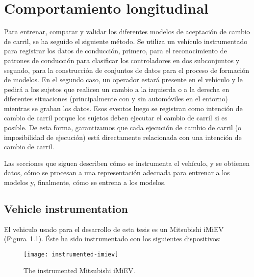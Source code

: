 \chapter{Comportamiento longitudinal}
\label{ch:longitudinal-submodel}


Para entrenar, comparar y validar los diferentes modelos de aceptación de cambio de carril, se ha seguido el siguiente método. Se utiliza un vehículo instrumentado para registrar los datos de conducción, primero, para el reconocimiento de patrones de conducción para clasificar los controladores en dos subconjuntos y segundo, para la construcción de conjuntos de datos para el proceso de formación de modelos. En el segundo caso, un operador estará presente en el vehículo y le pedirá a los sujetos que realicen un cambio a la izquierda o a la derecha en diferentes situaciones (principalmente con y sin automóviles en el entorno) mientras se graban los datos. Esos eventos luego se registran como intención de cambio de carril porque los sujetos deben ejecutar el cambio de carril si es posible. De esta forma, garantizamos que cada ejecución de cambio de carril (o imposibilidad de ejecución) está directamente relacionada con una intención de cambio de carril.

Las secciones que siguen describen cómo se instrumenta el vehículo, y se obtienen datos, cómo se procesan a una representación adecuada para entrenar a los modelos y, finalmente, cómo se entrena a los modelos.

\section{Vehicle instrumentation}

El vehiculo usado para el desarrollo de esta tesis es un Mitsubishi iMiEV (Figura~\ref{fig:instrumented-imiev}). Éste ha sido instrumentado con los siguientes dispositivos:

\begin{figure}
	\texttt{[image: instrumented-imiev]}
	\caption{The instrumented Mitsubishi iMiEV.}
	\label{fig:instrumented-imiev}
\end{figure}

